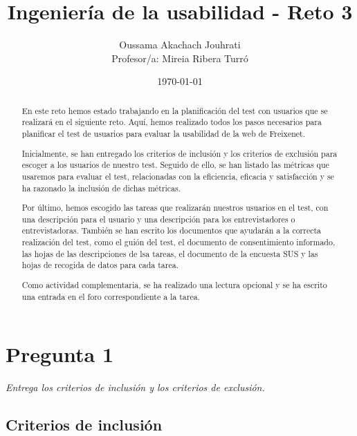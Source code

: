 \documentclass[spanish]{article}
\title{Ingeniería de la usabilidad - Reto 3}
\author{Oussama Akachach Jouhrati\\[0.5cm]{\small Profesor/a: Mireia Ribera Turró}}
\date{\today}
\begin{document}
\maketitle
\newpage

\tableofcontents
{}
\setcounter{page}{2}
\newpage



\begin{abstract}

En este reto hemos estado trabajando en la planificación del
test con usuarios que se realizará en el siguiente reto.
Aquí, hemos realizado todos los pasos necesarios para
planificar el test de usuarios para evaluar la usabilidad de
la web de Freixenet.\newline

Inicialmente, se han entregado los criterios de inclusión y los
criterios de exclusión para escoger a los usuarios de
nuestro test. Seguido de ello, se han listado las métricas
que usaremos para evaluar el test, relacionadas con la
eficiencia, eficacia y satisfacción y se ha razonado la
inclusión de dichas métricas.\newline

Por último, hemos escogido las tareas que realizarán
nuestros usuarios en el test, con una descripción para el
usuario y una descripción para los entrevistadores o
entrevistadoras. También se han escrito los documentos que
ayudarán a la correcta realización del test, como el guión
del test, el documento de consentimiento informado, las
hojas de las descripciones de lsa tareas, el documento de la
encuesta SUS y las hojas de recogida de datos para cada
tarea.\newline

Como actividad complementaria, se ha realizado una lectura
opcional y se ha escrito una entrada en el foro
correspondiente a la tarea.

\end{abstract}
\newpage

\section{Pregunta 1}

\textit{Entrega los criterios de inclusión y los criterios
de exclusión.}

\subsection{Criterios de inclusión}
\end{document}
